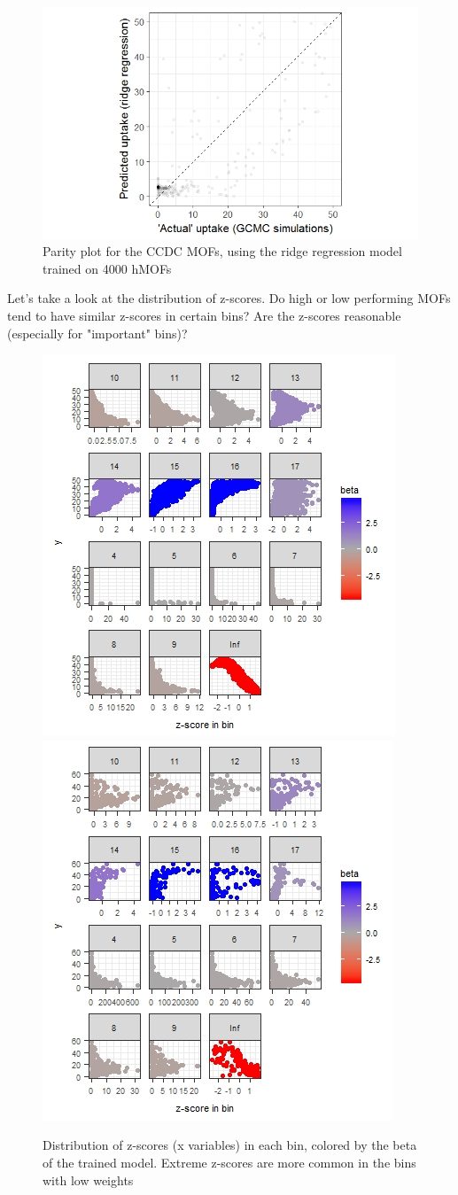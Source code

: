 \documentclass[letterpaper]{article}
\begin{document}
\begin{figure}[H]
	\centering
	\includegraphics[width=0.75\columnwidth]{Figs/initial_ccdc.png}
	\caption{Parity plot for the CCDC MOFs, using the ridge regression model trained on 4000 hMOFs}
	\label{fig:init_ccdc_parity}
\end{figure}


Let's take a look at the distribution of z-scores.  Do high or low performing MOFs tend to have similar z-scores in certain bins?  Are the z-scores reasonable (especially for "important" bins)?
\begin{figure}[H]
	\centering
	\includegraphics[width=0.47\columnwidth]{Figs/z_distr.png}
	\includegraphics[width=0.47\columnwidth]{Figs/z_distr_init_ccdc.png}
	\caption{Distribution of z-scores (x variables) in each bin, colored by the beta of the trained model.  Extreme z-scores are more common in the bins with low weights}
	\label{fig:z_distr}
\end{figure}
\end{document}
